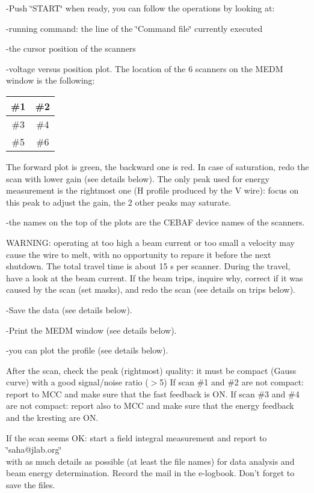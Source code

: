-Push \char`\"{}START\char`\"{} when ready, you can follow the operations by
looking at: 

-running command: the line of the \char`\"{}Command file\char`\"{} currently
executed 

-the cursor position of the scanners 

-voltage versus position plot. The location of the 6 scanners on the MEDM window
is the following: 

\vspace{0.3cm}
{\centering \begin{tabular}{|c|c|}
\hline 
\#1&
\#2\\
\hline 
\hline 
\#3&
\#4\\
\hline 
\#5&
\#6\\
\hline 
\end{tabular}\par}
\vspace{0.3cm}

The forward plot is green, the backward one is red. In case of saturation, redo
the scan with lower gain (see details below). The only peak used for energy
measurement is the rightmost one (H profile produced by the V wire): focus on
this peak to adjust the gain, the 2 other peaks may saturate. 

-the names on the top of the plots are the CEBAF device names of the scanners. 

WARNING: operating at too high a beam current or too small a velocity may cause
the wire to melt, with no opportunity to repare it before the next shutdown.
The total travel time is about 15 s per scanner. During the travel, have a look
at the beam current. If the beam trips, inquire why, correct if it was caused
by the scan (set masks), and redo the scan (see details on trips below). 

-Save the data (see details below). 

-Print the MEDM window (see details below). 

-you can plot the profile (see details below). 

After the scan, check the peak (rightmost) quality: it must be compact (Gauss
curve) with a good signal/noise ratio ($>$5) If scan \#1 and \#2 are not compact:
report to MCC and make sure that the fast feedback is ON. If scan \#3 and \#4
are not compact: report also to MCC and make sure that the energy feedback and
the kresting are ON. 

If the scan seems OK: start a field integral measurement and
 report to \\
 \char`\"{}saha@jlab.org\char`\"{} \\
with as much details as possible (at least the file names) for data analysis
and beam energy determination. Record the mail in the e-logbook. Don't forget
to save the files. 


